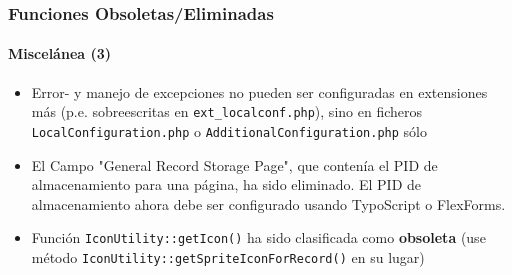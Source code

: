 \begin{frame}[fragile]
	\frametitle{Funciones Obsoletas/Eliminadas}
	\framesubtitle{Miscelánea (3)}

	\begin{itemize}

		\item Error- y manejo de excepciones no pueden ser configuradas en extensiones más (p.e. sobreescritas en
			\texttt{ext\_localconf.php}), sino en ficheros \texttt{LocalConfiguration.php} o
			\texttt{AdditionalConfiguration.php} sólo

		\item El Campo "General Record Storage Page", que contenía el PID de almacenamiento para una página, ha sido eliminado.
			El PID de almacenamiento ahora debe ser configurado usando TypoScript o FlexForms.

		\item Función \texttt{IconUtility::getIcon()} ha sido clasificada como \textbf{obsoleta} (use
			método \texttt{IconUtility::getSpriteIconForRecord()} en su lugar)

	\end{itemize}

\end{frame}

